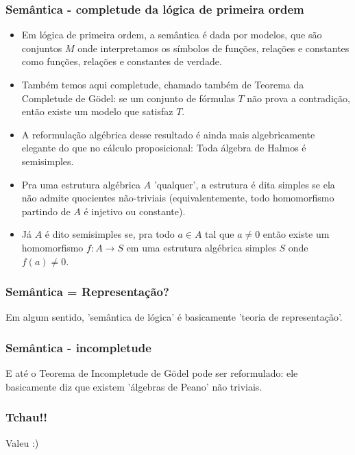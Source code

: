 \begin{frame}{}
\frametitle{Semântica - completude da lógica de primeira ordem}
\pause

\begin{itemize}
\item Em lógica de primeira ordem, a semântica é dada por modelos, que são conjuntos $M$ onde interpretamos os símbolos de funções, relações e constantes como funções, relações e constantes de verdade. \pause

\item Também temos aqui completude, chamado também de Teorema da Completude de Gödel: se um conjunto de fórmulas $T$ não prova a contradição, então existe um modelo que satisfaz $T$. \pause

\item A reformulação algébrica desse resultado é ainda mais algebricamente elegante do que no cálculo proposicional: Toda álgebra de Halmos é semisimples. \pause
\item  Pra uma estrutura algébrica $A$ 'qualquer', a estrutura é dita simples se ela não admite quocientes não-triviais (equivalentemente, todo homomorfismo partindo de $A$ é injetivo ou constante). \pause
\item Já $A$ é dito semisimples se, pra todo $a \in A$ tal que $a \neq 0$ então existe um homomorfismo $f: A \rightarrow S$ em uma estrutura algébrica simples $S$ onde $f(a) \neq 0$.
\end{itemize}
\end{frame}

\begin{frame}{}
    \frametitle {Semântica = Representação?}

    Em algum sentido, 'semântica de lógica' é basicamente 'teoria de representação'.
\end{frame}

\begin{frame}{}
\frametitle{Semântica - incompletude}

E até o Teorema de Incompletude de Gödel pode ser reformulado: ele basicamente diz que existem 'álgebras de Peano' não triviais.

\end{frame}


\begin{frame}{}
\frametitle{Tchau!!}

Valeu :)

\end{frame}


